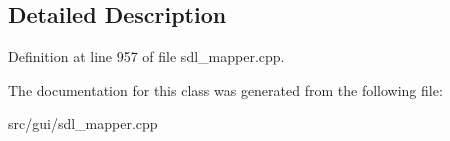 \subsection{Detailed Description}


Definition at line 957 of file sdl\-\_\-mapper.\-cpp.



The documentation for this class was generated from the following file\-:\begin{DoxyCompactItemize}
\item 
src/gui/sdl\-\_\-mapper.\-cpp\end{DoxyCompactItemize}
